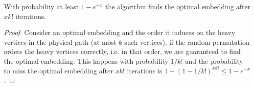 \begin{theorem}
With probability at least $1 - e^{-x}$ the algorithm finds the optimal embedding
after $xk!$ iterations.
\end{theorem}

\begin{proof}
Consider an optimal embedding and the order it induces on the heavy vertices in
the physical path (at most $k$ such vertices), if the random permutation orders
the heavy vertices correctly, i.e. in that order, we are guaranteed to find the
optimal embedding.
This happens with probability $1/k!$ and the probability to miss the optimal
embedding after $xk!$ iterations is $1 - (1 - 1/k!)^{xk!} \leq 1 - e^{-x}$.
\end{proof}
